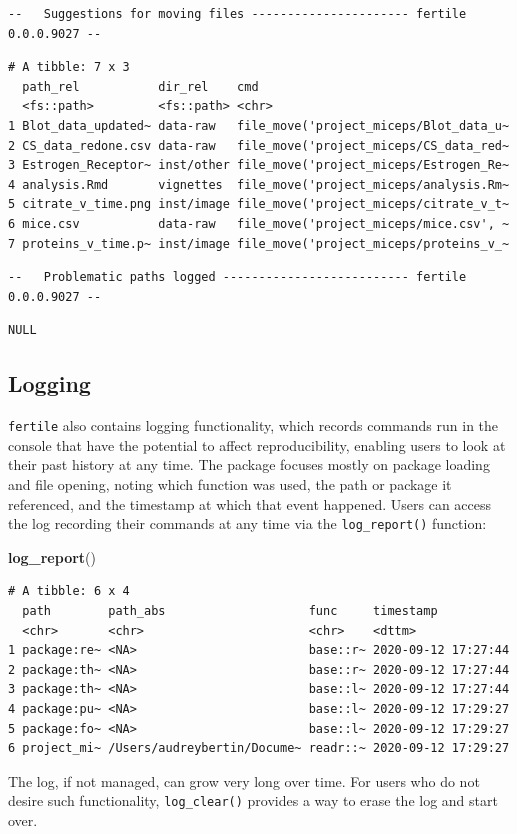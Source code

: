 \documentclass[12pt,twoside]{reedthesis}
\newenvironment{Shaded}{\begin{snugshade}}{\end{snugshade}}
\newcommand{\KeywordTok}[1]{\textcolor[rgb]{0.13,0.29,0.53}{\textbf{#1}}}
\newcommand{\NormalTok}[1]{#1}
\begin{document}
\begin{verbatim}
--   Suggestions for moving files ---------------------- fertile 0.0.0.9027 --
\end{verbatim}
\begin{verbatim}
# A tibble: 7 x 3
  path_rel           dir_rel    cmd                                   
  <fs::path>         <fs::path> <chr>                                 
1 Blot_data_updated~ data-raw   file_move('project_miceps/Blot_data_u~
2 CS_data_redone.csv data-raw   file_move('project_miceps/CS_data_red~
3 Estrogen_Receptor~ inst/other file_move('project_miceps/Estrogen_Re~
4 analysis.Rmd       vignettes  file_move('project_miceps/analysis.Rm~
5 citrate_v_time.png inst/image file_move('project_miceps/citrate_v_t~
6 mice.csv           data-raw   file_move('project_miceps/mice.csv', ~
7 proteins_v_time.p~ inst/image file_move('project_miceps/proteins_v_~
\end{verbatim}
\begin{verbatim}
--   Problematic paths logged -------------------------- fertile 0.0.0.9027 --
\end{verbatim}
\begin{verbatim}
NULL
\end{verbatim}
\subsection{Logging}\label{logging}

\texttt{fertile} also contains logging functionality, which records
commands run in the console that have the potential to affect
reproducibility, enabling users to look at their past history at any
time. The package focuses mostly on package loading and file opening,
noting which function was used, the path or package it referenced, and
the timestamp at which that event happened. Users can access the log
recording their commands at any time via the \texttt{log\_report()}
function:
\begin{Shaded}
\begin{Highlighting}[]
\KeywordTok{log_report}\NormalTok{()}
\end{Highlighting}
\end{Shaded}
\begin{verbatim}
# A tibble: 6 x 4
  path        path_abs                    func     timestamp          
  <chr>       <chr>                       <chr>    <dttm>             
1 package:re~ <NA>                        base::r~ 2020-09-12 17:27:44
2 package:th~ <NA>                        base::r~ 2020-09-12 17:27:44
3 package:th~ <NA>                        base::l~ 2020-09-12 17:27:44
4 package:pu~ <NA>                        base::l~ 2020-09-12 17:29:27
5 package:fo~ <NA>                        base::l~ 2020-09-12 17:29:27
6 project_mi~ /Users/audreybertin/Docume~ readr::~ 2020-09-12 17:29:27
\end{verbatim}
The log, if not managed, can grow very long over time. For users who do
not desire such functionality, \texttt{log\_clear()} provides a way to
erase the log and start over.
\end{document}
